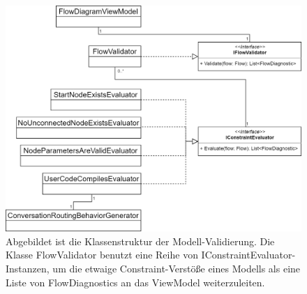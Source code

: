 \begin{figure} %
	\centering
		\includegraphics[width=\textwidth]{img/FlowValidatorClassStructure.png}
	\caption[Klassenstruktur der Modell-Validierung]{Abgebildet ist die Klassenstruktur der Modell-Validierung. Die Klasse FlowValidator benutzt eine Reihe von IConstraintEvaluator-Instanzen, um die etwaige Constraint-Verstöße eines Modells als eine Liste von FlowDiagnostics an das ViewModel weiterzuleiten.}
	\label{fig:UML:FlowValidatorClassStructure}
\end{figure}